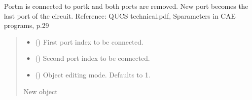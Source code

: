 \documentclass[letterpaper,10pt,english]{sphinxmanual}
\begin{document}
\begin{fulllineitems}

\begin{fulllineitems}
\label{\detokenize{touchstone:touchstone.spfile.connect_2_ports_retain}}
\pysigstartsignatures
{}
\pysigstopsignatures
\sphinxAtStartPar
Port\sphinxhyphen{}m is connected to port\sphinxhyphen{}k and both ports are removed. New port becomes the last port of the circuit.
Reference: QUCS technical.pdf, S\sphinxhyphen{}parameters in CAE programs, p.29
\begin{quote}\begin{description}
\begin{itemize}
\item {}
\sphinxAtStartPar
{} () \textendash{} First port index to be connected.

\item {}
\sphinxAtStartPar
{} () \textendash{} Second port index to be connected.

\item {}
\sphinxAtStartPar
{} (\sphinxstyleliteralemphasis{\sphinxupquote{, }}) \textendash{} Object editing mode. Defaults to \sphinxhyphen{}1.

\end{itemize}

\sphinxAtStartPar
New  object

\sphinxAtStartPar
{\hyperref[\detokenize{touchstone:touchstone.spfile}]{}}

\end{description}\end{quote}

\end{fulllineitems}



\end{fulllineitems}
\end{document}
